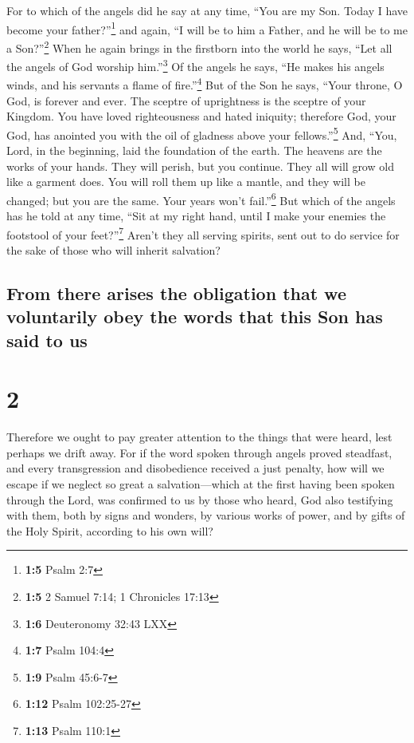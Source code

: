  For to which of the angels did he say at any time, ``You
are my Son. Today I have become your father?''\footnote{\textbf{1:5}
  Psalm 2:7} and again, ``I will be to him a Father, and he will be to
me a Son?''\footnote{\textbf{1:5} 2 Samuel 7:14; 1 Chronicles 17:13}
 When he again brings in the firstborn into the world he
says, ``Let all the angels of God worship him.''\footnote{\textbf{1:6}
  Deuteronomy 32:43 LXX}  Of the angels he says, ``He
makes his angels winds, and his servants a flame of fire.''\footnote{\textbf{1:7}
  Psalm 104:4}  But of the Son he says, ``Your throne, O
God, is forever and ever. The sceptre of uprightness is the sceptre of
your Kingdom.  You have loved righteousness and hated
iniquity; therefore God, your God, has anointed you with the oil of
gladness above your fellows.''\footnote{\textbf{1:9} Psalm 45:6-7}
 And, ``You, Lord, in the beginning, laid the foundation
of the earth. The heavens are the works of your hands. 
They will perish, but you continue. They all will grow old like a
garment does.  You will roll them up like a mantle, and
they will be changed; but you are the same. Your years won't
fail.''\footnote{\textbf{1:12} Psalm 102:25-27}  But
which of the angels has he told at any time, ``Sit at my right hand,
until I make your enemies the footstool of your feet?''\footnote{\textbf{1:13}
  Psalm 110:1}  Aren't they all serving spirits, sent out
to do service for the sake of those who will inherit salvation?

\hypertarget{from-there-arises-the-obligation-that-we-voluntarily-obey-the-words-that-this-son-has-said-to-us}{%
\subsection{From there arises the obligation that we voluntarily obey
the words that this Son has said to
us}\label{from-there-arises-the-obligation-that-we-voluntarily-obey-the-words-that-this-son-has-said-to-us}}

\hypertarget{section-1}{%
\section{2}\label{section-1}}

 Therefore we ought to pay greater attention to the things
that were heard, lest perhaps we drift away.  For if the
word spoken through angels proved steadfast, and every transgression and
disobedience received a just penalty,  how will we escape
if we neglect so great a salvation---which at the first having been
spoken through the Lord, was confirmed to us by those who heard,
 God also testifying with them, both by signs and wonders,
by various works of power, and by gifts of the Holy Spirit, according to
his own will?

